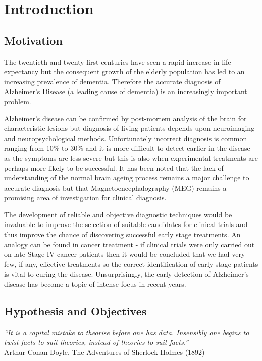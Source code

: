 \chapter{Introduction}

 

\section{Motivation}

The twentieth and twenty-first centuries have seen a rapid increase in life expectancy but the consequent growth of the elderly population has led to an increasing prevalence of dementia.\cite{Hebert2014} Therefore the accurate diagnosis of Alzheimer's Disease (a leading cause of dementia) is an increasingly important problem.

Alzheimer's disease can be confirmed by post-mortem analysis of the brain for characteristic lesions but diagnosis of living patients depends upon neuroimaging and neuropsychological methods. Unfortunately incorrect diagnosis is common ranging from 10\% to 30\% and it is more difficult to detect earlier in the disease as the symptoms are less severe but this is also when experimental treatments are perhaps more likely to be successful. It has been noted that the lack of understanding of the normal brain ageing process remains a major challenge to accurate diagnosis but that Magnetoencephalography (MEG) remains a promising area of investigation for clinical diagnosis.\cite{Fernandez2013}

The development of reliable and objective diagnostic techniques would be invaluable to improve the selection of suitable candidates for clinical trials and thus improve the chance of discovering successful early stage treatments. An analogy can be found in cancer treatment - if clinical trials were only carried out on late Stage IV cancer patients then it would be concluded that we had very few, if any, effective treatments so the correct identification of early stage patients is vital to curing the disease. Unsurprisingly, the early detection of Alzheimer's disease has become a topic of intense focus in recent years. \cite{Nestor2004}



\section{Hypothesis and Objectives}

\begin{center}\textit{``It is a capital mistake to theorise before one has data. Insensibly one begins to twist facts to suit theories, instead of theories to suit facts.''}\\ Arthur Conan Doyle, The Adventures of Sherlock Holmes (1892)
\end{center}

